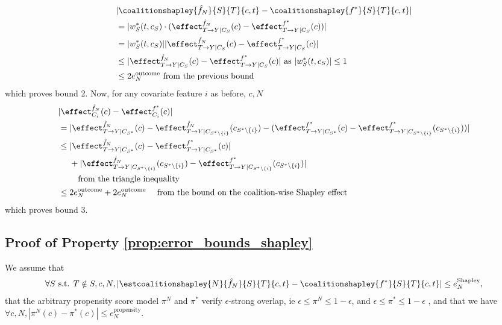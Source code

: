 \begin{align*}
&|\coalitionshapley{\hat{f}_N}{S}{T}{c,t}  - \coalitionshapley{f^*}{S}{T}{c,t} | \\
&= |w_S^*(t,c_S) \cdot ( \effect^{\hat{f}_N}_{ T \rightarrow Y | C_S}(c) - \effect^{f^*}_{ T \rightarrow Y | C_S}(c))| \\
&= |w_S^*(t,c_S)| | \effect^{\hat{f}_N}_{ T \rightarrow Y | C_S}(c) - \effect^{f^*}_{ T \rightarrow Y | C_S}(c)| \\
&\leq | \effect^{\hat{f}_N}_{ T \rightarrow Y | C_S}(c) - \effect^{f^*}_{ T \rightarrow Y | C_S}(c)| \text{ as } |w^*_S(t,c_S)| \leq 1 \\
&\leq  2e^\text{outcome}_N \text{ from the previous bound} \\
\end{align*}
which proves bound 2. Now, for any covariate feature $i$ as before, $c, N$
\begin{align*}
&| \effect^{\hat{f}_N}_{C_i}(c) - \effect^{f^*}_{C_i}(c) | \\
&= |\effect^{\hat{f}_N}_{ T \rightarrow Y | C_{S^*}}(c) - \effect^{\hat{f}_N}_{ T \rightarrow Y | C_{S^*\backslash \{i\} }}(c_{S^*\backslash \{i\}})   - (\effect^{f^*}_{ T \rightarrow Y | C_{S^*}}(c) - \effect^{f^*}_{ T \rightarrow Y | C_{S^*\backslash \{i\} }}(c_{S^*\backslash \{i\}}))| \\
&\leq |\effect^{\hat{f}_N}_{ T \rightarrow Y | C_{S^*}}(c) - \effect^{f^*}_{ T \rightarrow Y | C_{S^*}}(c)| \\
& \ \ \ \ + |\effect^{\hat{f}_N}_{ T \rightarrow Y | C_{S^*\backslash \{i\} }}(c_{S^*\backslash \{i\}}) - \effect^{f^*}_{ T \rightarrow Y | C_{S^*\backslash \{i\} }}(c_{S^*\backslash \{i\}})| \\
& \ \ \ \ \ \ \ \text{from the triangle inequality} \\
&\leq 2e^\text{outcome}_N + 2e^\text{outcome}_N \ \ \ \text{ from the bound on the coalition-wise Shapley effect} \\
\end{align*}
which proves bound 3.

\subsection{Proof of Property \ref{prop:error_bounds_shapley}} 
\label{proof:error_bounds_shapley}
We assume that
\begin{align*}
\forall S \text{ s.t. } T \notin S, c, N, |\estcoalitionshapley{N}{\hat{f}_N}{S}{T}{c,t} - \coalitionshapley{f^*}{S}{T}{c,t} | \leq e^\text{Shapley}_N,
\end{align*}
that the arbitrary propensity score model $\pi^N$ and $\pi^*$ verify $\epsilon$-strong overlap, ie $\epsilon \leq \pi^N \leq 1 - \epsilon$, and $\epsilon \leq \pi^* \leq 1 - \epsilon$ , and that we have $\forall c, N, |\pi^N(c) - \pi^*(c) | \leq e^\text{propensity}_N$.

